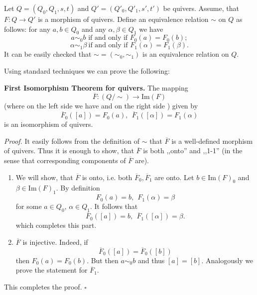 \documentclass[12pt]{article}
\begin{document}
Let $Q=(Q_0,Q_1,s,t)$ and $Q'=(Q'_0,Q'_1,s',t')$ be quivers. Assume, that $F:Q\to Q'$ is a morphism of quivers. Define an equivalence relation $\sim$ on $Q$ as follows: for any $a,b\in Q_0$ and any $\alpha,\beta\in Q_1$ we have
$$a\sim_0 b \mbox{ if and only if }F_0(a)=F_0(b);$$
$$\alpha\sim_1\beta\ \mbox{if and only if }F_1(\alpha)=F_1(\beta).$$
It can be easily checked that $\sim=(\sim_0,\sim_1)$ is an equivalence relation on $Q$.

Using standard techniques we can prove the following:

\textbf{First Isomorphism Theorem for quivers.} The mapping
$$\overline{F}:(Q/\sim)\to\mathrm{Im}(F)$$
(where on the left side we have  and on the right side ) given by
$$\overline{F}_0([a])=F_0(a),\ \ \overline{F}_1([\alpha])=F_1(\alpha)$$
is an isomorphism of quivers.

\textit{Proof.} It easily follows from the definition of $\sim$ that $\overline{F}$ is a well-defined morphism of quivers. Thus it is enough to show, that $\overline{F}$ is both ,,onto'' and ,,1-1'' (in the sense that corresponding components of $\overline{F}$ are).
\begin{enumerate}
\item We will show, that $\overline{F}$ is onto, i.e. both $\overline{F}_0,\overline{F}_1$ are onto. Let $b\in\mathrm{Im}(F)_0$ and $\beta\in\mathrm{Im}(F)_1$. By definition
$$F_0(a)=b,\ \ F_1(\alpha)=\beta$$
for some $a\in Q_0$, $\alpha\in Q_1$. It follows that
$$\overline{F}_0([a])=b,\ \ \overline{F}_1([\alpha])=\beta.$$
which completes this part.
\item $\overline{F}$ is injective. Indeed, if
$$\overline{F}_0([a])=\overline{F}_0([b])$$
then $F_0(a)=F_0(b)$. But then $a\sim_0 b$ and thus $[a]=[b]$. Analogously we prove the statement for $\overline{F}_1$.
\end{enumerate}
This completes the proof. $\square$
\end{document}
